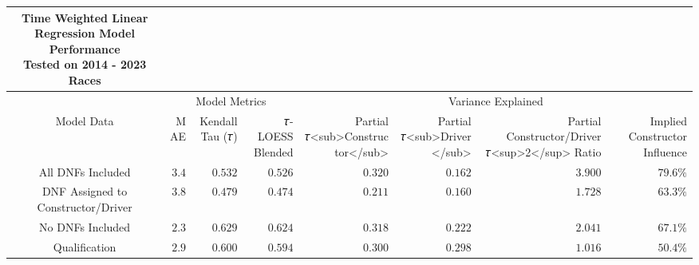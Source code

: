 \begin{longtable}{crrrrrrr}
\caption*{
{\large \textbf{Time Weighted Linear Regression Model Performance}} \\ 
{\small Tested on 2014 - 2023 Races}
} \\ 
\toprule
 & \multicolumn{3}{c}{Model Metrics} & \multicolumn{4}{c}{Variance Explained} \\ 
\cmidrule(lr){2-4} \cmidrule(lr){5-8}
Model Data & MAE & Kendall Tau (𝜏) & 𝜏-LOESS Blended & Partial 𝜏<sub>Constructor</sub> & Partial 𝜏<sub>Driver</sub> & Partial Constructor/Driver 𝜏<sup>2</sup> Ratio & Implied Constructor Influence \\ 
\midrule\addlinespace[2.5pt]
All DNFs Included & $3.4$ & $0.532$ & $0.526$ & $0.320$ & $0.162$ & $3.900$ & $79.6\%$ \\ 
DNF Assigned to Constructor/Driver & $3.8$ & $0.479$ & $0.474$ & $0.211$ & $0.160$ & $1.728$ & $63.3\%$ \\ 
No DNFs Included & $2.3$ & $0.629$ & $0.624$ & $0.318$ & $0.222$ & $2.041$ & $67.1\%$ \\ 
Qualification & $2.9$ & $0.600$ & $0.594$ & $0.300$ & $0.298$ & $1.016$ & $50.4\%$ \\ 
\bottomrule
\end{longtable}

